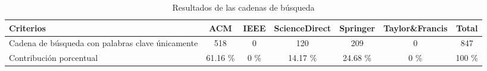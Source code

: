

\begin{table}[H]
	\centering
	\caption{Resultados de las cadenas de búsqueda}
	\label{table:bases-sin-criterio}
	\begin{tabular}{|p{4.5cm}|c|c|c|c|c|c|}
		\hline
		\textbf{Criterios}                               & \textbf{ACM} & \textbf{IEEE} & \textbf{ScienceDirect} & \textbf{Springer} & \textbf{Taylor\&Francis} & \textbf{Total} \\
		\hline
		Cadena de búsqueda con palabras clave únicamente & 518          & 0             & 120                    & 209               & 0                        & 847            \\
		\hline
		Contribución porcentual                          & 61.16 \%     & 0 \%          & 14.17 \%               & 24.68 \%          & 0 \%                     & 100 \%         \\
		\hline
	\end{tabular}
\end{table}
